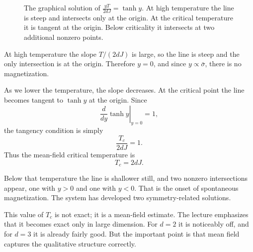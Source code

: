 \begin{figure}[h]
\centering
{}
\caption{The graphical solution of \(\frac{yT}{2dJ}=\tanh y\). At high temperature the line is steep and intersects only at the origin. At the critical temperature it is tangent at the origin. Below criticality it intersects at two additional nonzero points.}
\end{figure}

At high temperature the slope \(T/(2dJ)\) is large, so the line is steep and the only intersection is at the origin. Therefore \(y=0\), and since \(y\propto \bar{\sigma}\), there is no magnetization.

As we lower the temperature, the slope decreases. At the critical point the line becomes tangent to \(\tanh y\) at the origin. Since
\begin{equation}
\left.\frac{d}{dy}\tanh y\right|_{y=0}=1,
\end{equation}
the tangency condition is simply
\begin{equation}
\frac{T_c}{2dJ}=1.
\end{equation}
Thus the mean-field critical temperature is
\begin{equation}
T_c=2dJ.
\end{equation}

Below that temperature the line is shallower still, and two nonzero intersections appear, one with \(y>0\) and one with \(y<0\). That is the onset of spontaneous magnetization. The system has developed two symmetry-related solutions.

This value of \(T_c\) is not exact; it is a mean-field estimate. The lecture emphasizes that it becomes exact only in large dimension. For \(d=2\) it is noticeably off, and for \(d=3\) it is already fairly good. But the important point is that mean field captures the qualitative structure correctly.

